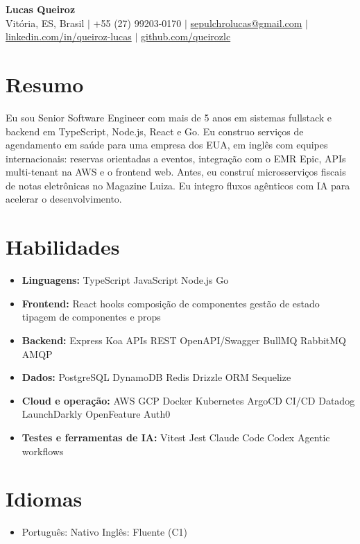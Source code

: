 \documentclass[letterpaper,10pt]{article}
\newcommand{\resumeItem}[1]{\item\small{#1}}
\newcommand{\resumeSubHeadingList}{\begin{itemize}[leftmargin=0.15in, label={}, nosep]}
\newcommand{\resumeSubHeadingListEnd}{\end{itemize}}
\begin{document}
\begin{center}
  \textbf{\Huge Lucas Queiroz} \\[3pt]
  \small Vit\'oria, ES, Brasil $|$ +55 (27) 99203-0170 $|$ \href{mailto:sepulchrolucas@gmail.com}{sepulchrolucas@gmail.com} $|$
  \href{https://linkedin.com/in/queiroz-lucas}{linkedin.com/in/queiroz-lucas} $|$
  \href{https://github.com/queirozlc}{github.com/queirozlc}
\end{center}
\vspace{2pt}

\section{Resumo}
Eu sou Senior Software Engineer com mais de 5 anos em sistemas fullstack e backend em TypeScript, Node.js, React e Go. Eu construo servi\c{c}os de agendamento em sa\'ude para uma empresa dos EUA, em ingl\^es com equipes internacionais: reservas orientadas a eventos, integra\c{c}\~ao com o EMR Epic, APIs multi-tenant na AWS e o frontend web. Antes, eu constru\'i microsservi\c{c}os fiscais de notas eletr\^onicas no Magazine Luiza. Eu integro fluxos ag\^enticos com IA para acelerar o desenvolvimento.
\section{Habilidades}
\resumeSubHeadingList
\resumeItem{\textbf{Linguagens:} TypeScript \textbar{} JavaScript \textbar{} Node.js \textbar{} Go}
\resumeItem{\textbf{Frontend:} React \textbar{} hooks \textbar{} composi\c{c}\~ao de componentes \textbar{} gest\~ao de estado \textbar{} tipagem de componentes e props}
\resumeItem{\textbf{Backend:} Express \textbar{} Koa \textbar{} APIs REST \textbar{} OpenAPI/Swagger \textbar{} BullMQ \textbar{} RabbitMQ \textbar{} AMQP}
\resumeItem{\textbf{Dados:} PostgreSQL \textbar{} DynamoDB \textbar{} Redis \textbar{} Drizzle ORM \textbar{} Sequelize}
\resumeItem{\textbf{Cloud e opera\c{c}\~ao:} AWS \textbar{} GCP \textbar{} Docker \textbar{} Kubernetes \textbar{} ArgoCD \textbar{} CI/CD \textbar{} Datadog \textbar{} LaunchDarkly \textbar{} OpenFeature \textbar{} Auth0}
\resumeItem{\textbf{Testes e ferramentas de IA:} Vitest \textbar{} Jest \textbar{} Claude Code \textbar{} Codex \textbar{} Agentic workflows}\resumeSubHeadingListEnd

\section{Idiomas}
\resumeSubHeadingList
\resumeItem{Portugu\^es: Nativo \textbar{} Ingl\^es: Fluente (C1)}
\resumeSubHeadingListEnd
\end{document}
